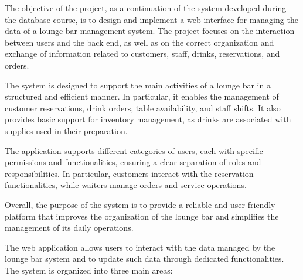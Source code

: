\documentclass[a4paper]{article}
\begin{document}
\maketitle





The objective of the project, as a continuation of the system developed during the database course, is to design and implement a web interface for managing the data of a lounge bar management system. The project focuses on the interaction between users and the back end, as well as on the correct organization and exchange of information related to customers, staff, drinks, reservations, and orders.

The system is designed to support the main activities of a lounge bar in a structured and efficient manner. In particular, it enables the management of customer reservations, drink orders, table availability, and staff shifts. It also provides basic support for inventory management, as drinks are associated with supplies used in their preparation.

The application supports different categories of users, each with specific permissions and functionalities, ensuring a clear separation of roles and responsibilities. In particular, customers interact with the reservation functionalities, while waiters manage orders and service operations.

Overall, the purpose of the system is to provide a reliable and user-friendly platform that improves the organization of the lounge bar and simplifies the management of its daily operations.






The web application allows users to interact with the data managed by the lounge bar system and to update such data through dedicated functionalities. \\
The system is organized into three main areas:
\end{document}
